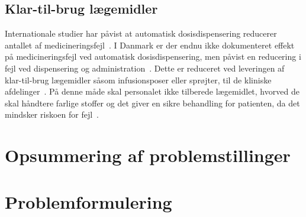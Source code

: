 \subsection{Klar-til-brug lægemidler}
Internationale studier har påvist at automatisk dosisdispensering reducerer antallet af medicineringsfejl~\citep{Oren2003,Sygehusapotekerne2012}. I Danmark er der endnu ikke dokumenteret effekt på medicineringsfejl ved automatisk dosisdispensering, men påvist en reducering i fejl ved dispensering og administration~\citep{Sygehusapotekerne2012}. Dette er reduceret ved leveringen af klar-til-brug lægemidler såsom infusionsposer eller sprøjter, til de kliniske afdelinger~\citep{Sygehusapotekerne2012}. På denne måde skal personalet ikke tilberede lægemidlet, hvorved de skal håndtere farlige stoffer og det giver en sikre behandling for patienten, da det mindsker riskoen for fejl~\citep{Amgros2013}. 

\section{Opsummering af problemstillinger}
\section{Problemformulering}




